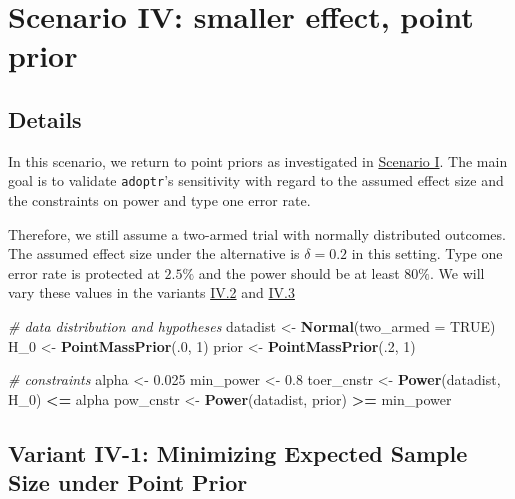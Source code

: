 \documentclass[]{book}
\newenvironment{Shaded}{\begin{snugshade}}{\end{snugshade}}
\newcommand{\CommentTok}[1]{\textcolor[rgb]{0.56,0.35,0.01}{\textit{#1}}}
\newcommand{\DataTypeTok}[1]{\textcolor[rgb]{0.13,0.29,0.53}{#1}}
\newcommand{\DecValTok}[1]{\textcolor[rgb]{0.00,0.00,0.81}{#1}}
\newcommand{\FloatTok}[1]{\textcolor[rgb]{0.00,0.00,0.81}{#1}}
\newcommand{\KeywordTok}[1]{\textcolor[rgb]{0.13,0.29,0.53}{\textbf{#1}}}
\newcommand{\NormalTok}[1]{#1}
\newcommand{\OperatorTok}[1]{\textcolor[rgb]{0.81,0.36,0.00}{\textbf{#1}}}
\newcommand{\OtherTok}[1]{\textcolor[rgb]{0.56,0.35,0.01}{#1}}
\newcommand{\StringTok}[1]{\textcolor[rgb]{0.31,0.60,0.02}{#1}}
\begin{document}
\hypertarget{scenarioIV}{%
\chapter{Scenario IV: smaller effect, point prior}\label{scenarioIV}}

\hypertarget{details-3}{%
\section{Details}\label{details-3}}

In this scenario, we return to point priors as investigated in
\protect\hyperlink{scenarioI}{Scenario I}.
The main goal is to validate \texttt{adoptr}'s sensitivity with regard to
the assumed effect size and the constraints on power and type one error rate.

Therefore, we still assume a two-armed trial with normally distributed outcomes.
The assumed effect size under the alternative is \(\delta = 0.2\) in this setting.
Type one error rate is protected at \(2.5\%\) and the power should be at least
\(80\%\). We will vary these values in the variants \protect\hyperlink{variantIV.2}{IV.2} and
\protect\hyperlink{variantIV.3}{IV.3}

\begin{Shaded}
\begin{Highlighting}[]
\CommentTok{# data distribution and hypotheses}
\NormalTok{datadist   <-}\StringTok{ }\KeywordTok{Normal}\NormalTok{(}\DataTypeTok{two_armed =} \OtherTok{TRUE}\NormalTok{)}
\NormalTok{H_}\DecValTok{0}\NormalTok{        <-}\StringTok{ }\KeywordTok{PointMassPrior}\NormalTok{(.}\DecValTok{0}\NormalTok{, }\DecValTok{1}\NormalTok{)}
\NormalTok{prior      <-}\StringTok{ }\KeywordTok{PointMassPrior}\NormalTok{(.}\DecValTok{2}\NormalTok{, }\DecValTok{1}\NormalTok{)}

\CommentTok{# constraints}
\NormalTok{alpha      <-}\StringTok{ }\FloatTok{0.025}
\NormalTok{min_power  <-}\StringTok{ }\FloatTok{0.8}
\NormalTok{toer_cnstr <-}\StringTok{ }\KeywordTok{Power}\NormalTok{(datadist, H_}\DecValTok{0}\NormalTok{)   }\OperatorTok{<=}\StringTok{ }\NormalTok{alpha}
\NormalTok{pow_cnstr  <-}\StringTok{ }\KeywordTok{Power}\NormalTok{(datadist, prior) }\OperatorTok{>=}\StringTok{ }\NormalTok{min_power}
\end{Highlighting}
\end{Shaded}

\hypertarget{variantIV_1}{%
\section{Variant IV-1: Minimizing Expected Sample Size under Point Prior}\label{variantIV_1}}
\end{document}

